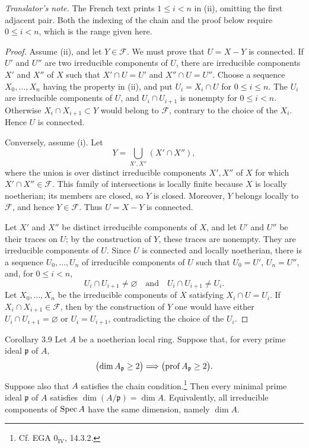 \noindent\textit{Translator's note.} The French text prints
$1\le i<n$ in (ii), omitting the first adjacent pair. Both the indexing of
the chain and the proof below require $0\le i<n$, which is the range given
here.

\begin{proof}
Assume (ii), and let $Y\in\mathcal F$. We must prove that $U=X-Y$ is
connected. If $U'$ and $U''$ are two irreducible components of $U$, there are
irreducible components $X'$ and $X''$ of $X$ such that
$X'\cap U=U'$ and $X''\cap U=U''$. Choose a sequence
$X_0,\ldots,X_n$ having the property in (ii), and put
$U_i=X_i\cap U$ for $0\le i\le n$. The $U_i$ are irreducible components of
$U$, and $U_i\cap U_{i+1}$ is nonempty for $0\le i<n$. Otherwise
$X_i\cap X_{i+1}\subset Y$ would belong to $\mathcal F$, contrary to the
choice of the $X_i$. Hence $U$ is connected.

Conversely, assume (i). Let
\[
  Y=\bigcup_{X',X''}(X'\cap X''),
\]
where the union is over distinct irreducible components $X',X''$ of $X$ for
which $X'\cap X''\in\mathcal F$. This family of intersections is locally
finite because $X$ is locally noetherian; its members are closed, so $Y$ is
closed. Moreover, $Y$ belongs locally to $\mathcal F$, and hence
$Y\in\mathcal F$. Thus $U=X-Y$ is connected.

Let $X'$ and $X''$ be distinct irreducible components of $X$, and let $U'$
and $U''$ be their traces on $U$; by the construction of $Y$, these traces
are nonempty. They are irreducible components of $U$. Since $U$ is connected
and locally noetherian, there is a sequence $U_0,\ldots,U_n$ of irreducible
components of $U$ such that $U_0=U'$, $U_n=U''$, and, for $0\le i<n$,
\[
  U_i\cap U_{i+1}\ne\varnothing
  \quad\text{and}\quad U_i\cap U_{i+1}\ne U_i.
\]
Let $X_0,\ldots,X_n$ be the irreducible components of $X$ satisfying
$X_i\cap U=U_i$. If $X_i\cap X_{i+1}\in\mathcal F$, then by the construction
of $Y$ one would have either $U_i\cap U_{i+1}=\varnothing$ or
$U_i=U_{i+1}$, contradicting the choice of the $U_i$.
\end{proof}


\begin{sgastatement}{Corollary 3.9}
Let $A$ be a noetherian local ring. Suppose that, for every prime ideal
$\mathfrak p$ of $A$,
\[
  \bigl(\dim A_{\mathfrak p}\ge2\bigr)
  \Longrightarrow
  \bigl(\operatorname{prof} A_{\mathfrak p}\ge2\bigr).
\]
Suppose also that $A$ satisfies the chain condition.\footnote{Cf. EGA
$0_{\mathrm{IV}}$, 14.3.2.} Then every minimal prime ideal $\mathfrak p$ of
$A$ satisfies $\dim(A/\mathfrak p)=\dim A$. Equivalently, all irreducible
components of $\operatorname{Spec} A$ have the same dimension, namely $\dim A$.
\end{sgastatement}

